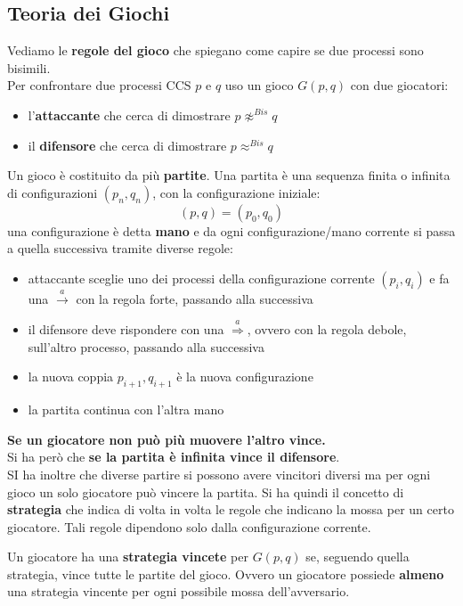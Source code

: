 \subsection{Teoria dei Giochi}
Vediamo le \textbf{regole del gioco} che spiegano come capire se due processi
sono bisimili. \\
Per confrontare due processi CCS $p$ e $q$ uso un gioco $G(p, q)$ con due
giocatori: 
\begin{itemize}
  \item l'\textbf{attaccante} che cerca di dimostrare $p\not\approx^{Bis}q$
  \item il \textbf{difensore }che cerca di dimostrare $p\approx^{Bis}q$
\end{itemize}
Un gioco è costituito da più \textbf{partite}.
Una partita è una sequenza finita o infinita di configurazioni $(p_n, q_n)$, con
la configurazione iniziale:
\[(p, q)=(p_0, q_0)\]
una configurazione è detta \textbf{mano} e da ogni configurazione/mano corrente
si passa a quella successiva tramite diverse regole:
\begin{itemize}
  \item attaccante sceglie uno dei processi della configurazione corrente
  $(p_i, q_i)$ e fa una $\stackrel{a}{\rightarrow}$ con la regola forte, passando
  alla successiva
  \item il difensore deve rispondere con una $\stackrel{a}{\Rightarrow}$, ovvero
  con la regola debole, sull'altro processo, passando alla successiva
  \item la nuova coppia $p_{i+1}, q_{i+1}$ è la nuova configurazione
  \item la partita continua con l'altra mano
\end{itemize}
\textbf{Se un giocatore non può più muovere l'altro vince.}\\
Si ha però che \textbf{se la partita è infinita vince il difensore}.\\
SI ha inoltre che diverse partire si possono avere vincitori diversi ma per ogni
gioco un solo giocatore può vincere la partita. Si ha quindi il concetto di
\textbf{strategia} che indica di volta in volta le regole che indicano la mossa
per un certo giocatore. Tali regole dipendono solo dalla configurazione
corrente.\\
\begin{definizione}
Un giocatore ha una \textbf{strategia vincete} per $G(p, q)$ se, seguendo quella
strategia, vince tutte le partite del gioco. Ovvero un giocatore possiede \textbf{almeno} una strategia vincente per ogni possibile mossa dell'avversario.
\end{definizione}
